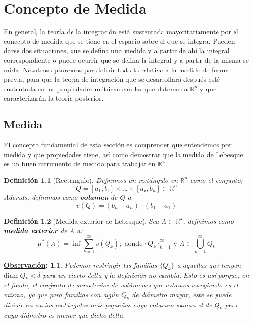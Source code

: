 \documentclass[10pt,a4paper,openright]{book}
\theoremstyle{break}
\newtheorem*{defi}{Definición}
\newtheorem*{obs}{\underline{Observación}:}
\begin{document}
\mainmatter
\hypersetup{linkcolor=black} %
\setcounter{tocdepth}{3}%
\setcounter{secnumdepth}{4}%
\tableofcontents
\hypersetup{linkcolor=blue} %

\chapter{Concepto de Medida}%
En general, la teoría de la integración está sustentada mayoritariamente por el concepto de medida que se tiene en el espacio sobre el que se integra. Pueden darse dos situaciones, que se defina una medida y a partir de ahí la integral correspondiente o puede ocurrir que se defina la integral y a partir de la misma se mida. Nosotros optaremos por definir todo lo relativo a la medida de forma previa, para que la teoría de integración que se desarrollará después esté sustentada en las propiedades métricas con las que dotemos a $\mathbb{R}^n$ y que caracterizarán la teoría posterior.

\section{Medida}
El concepto fundamental de esta sección es comprender qué entendemos por medida y que propiedades tiene, así como demostrar que la medida de Lebesque es un buen intrumento de medida para trabajar en $\mathbb{R}^n$.

\begin{defi}[Rectángulo]
Definimos un rectángulo en $\mathbb{R}^n$ como el conjunto;
$$Q = \left[ a_1, b_1 \right] \times \ldots \times \left[ a_n, b_n \right] \subset \mathbb{R}^{n}$$
Además, definimos como \textbf{volumen} de $Q$ a 
$$v\left( Q \right) = \left( b_n - a_n \right) \cdots \left( b_1 - a_1 \right)$$
\end{defi}

\begin{defi}[Medida exterior de Lebesque]
Sea $A \subset \mathbb{R}^{n}$, definimos como \textbf{medida exterior} de $A$ a:
$$
\mu^{*}(A) = \inf \sum_{k=1}^{\infty} v\left( Q_k \right); \text{ donde } \{Q_k\}_{k=1}^{\infty} \text{ y } A \subset \bigcup_{k = 1}^{\infty} Q_k
$$ 
\end{defi}

\begin{obs}
Podemos restringir las familias $\{Q_k\}$ a aquellas que tengan $\mathrm{diam}\ Q_k < \delta$ para un cierto delta y la definición no cambia. Esto es así porque, en el fondo, el conjunto de sumatorios de volúmenes que estamos escogiendo es el mismo, ya que para familias con algún $Q_k$ de diámetro mayor, éste se puede dividir en varios rectángulos más pequeños cuyo volumen suman el de $Q_k$ pero cuyo diámetro es menor que dicho delta.
\end{obs}
\end{document}
